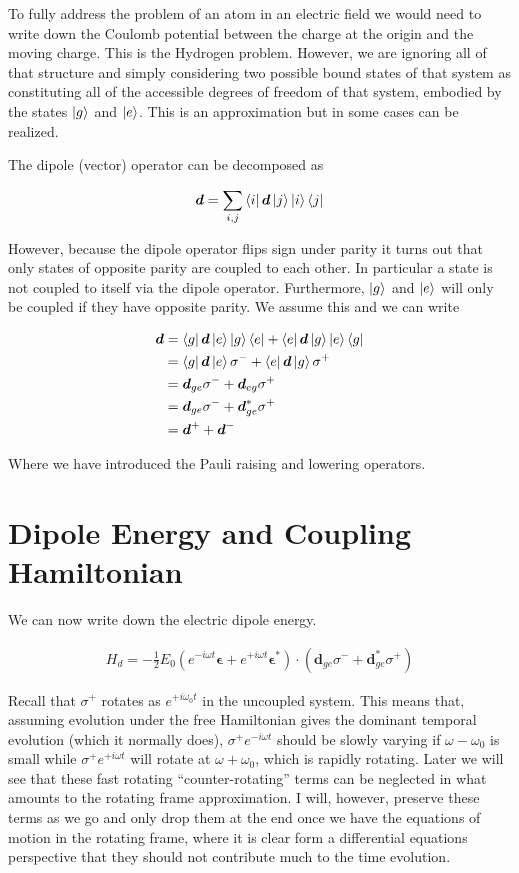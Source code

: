 \documentclass[12pt]{article}
\newcommand{\bv}[1]{\boldsymbol{#1}}
\begin{document}
To fully address the problem of an atom in an electric field we would need to write down the Coulomb potential between the charge at the origin and the moving charge. This is the Hydrogen problem. However, we are ignoring all of that structure and simply considering two possible bound states of that system as constituting all of the accessible degrees of freedom of that system, embodied by the states $\ket{g}$ and $\ket{e}$. This is an approximation but in some cases can be realized.

The dipole (vector) operator can be decomposed as

\begin{align}
\bv{d} = \sum_{i,j} \bra{i}\bv{d}\ket{j} \ket{i}\bra{j}
\end{align}

However, because the dipole operator flips sign under parity it turns out that only states of opposite parity are coupled to each other. In particular a state is not coupled to itself via the dipole operator. Furthermore, $\ket{g}$ and $\ket{e}$ will only be coupled if they have opposite parity. We assume this and we can write

\begin{align}
\bv{d} &= \bra{g}\bv{d}\ket{e} \ket{g}\bra{e} + \bra{e}\bv{d}\ket{g}\ket{e}\bra{g}\\
&= \bra{g}\bv{d}\ket{e} \sigma^- + \bra{e}\bv{d}\ket{g} \sigma^+\\
&= \bv{d}_{ge}\sigma^- + \bv{d}_{eg}\sigma^+\\
&= \bv{d}_{ge}\sigma^- + \bv{d}_{ge}^*\sigma^+\\
&= \bv{d}^+ + \bv{d}^-
\end{align}

Where we have introduced the Pauli raising and lowering operators.

\section{Dipole Energy and Coupling Hamiltonian}
We can now write down the electric dipole energy.

\begin{align}
H_d = -\frac{1}{2}E_0 \left(e^{-i\omega t} \bv{\epsilon} + e^{+i\omega t} \bv{\epsilon}^*\right)\cdot  \left(\bv{d}_{ge}\sigma^- + \bv{d}_{ge}^* \sigma^+\right)
\end{align}

Recall that $\sigma^+$ rotates as $e^{+i\omega_0 t}$ in the uncoupled system. This means that, assuming evolution under the free Hamiltonian gives the dominant temporal evolution (which it normally does), $\sigma^+ e^{-i\omega t}$ should be slowly varying if $\omega-\omega_0$ is small while $\sigma^+ e^{+i\omega t}$ will rotate at $\omega+\omega_0$, which is rapidly rotating. Later we will see that these fast rotating ``counter-rotating'' terms can be neglected in what amounts to the rotating frame approximation. I will, however, preserve these terms as we go and only drop them at the end once we have the equations of motion in the rotating frame, where it is clear form a differential equations perspective that they should not contribute much to the time evolution.
\end{document}
